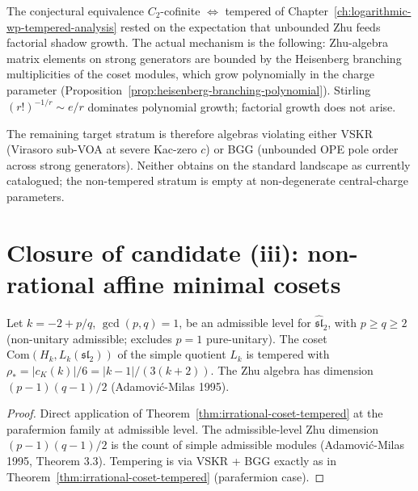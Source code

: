 \begin{remark}
\label{rem:heal-mode-refined-criterion}
The conjectural equivalence $C_2$-cofinite $\Leftrightarrow$ tempered
of Chapter~\ref{ch:logarithmic-wp-tempered-analysis} rested on the
expectation that unbounded Zhu feeds factorial shadow growth. The
actual mechanism is the following: Zhu-algebra matrix elements on
strong generators are bounded by the Heisenberg branching
multiplicities of the coset modules, which grow polynomially in the
charge parameter (Proposition~\ref{prop:heisenberg-branching-polynomial}).
Stirling $(r!)^{-1/r} \sim e/r$ dominates polynomial growth; factorial
growth does not arise.

The remaining target stratum is therefore algebras violating either
VSKR (Virasoro sub-VOA at severe Kac-zero $c$) or BGG (unbounded OPE
pole order across strong generators). Neither obtains on the standard
landscape as currently catalogued; the non-tempered stratum is empty
at non-degenerate central-charge parameters.
\end{remark}

\section{Closure of candidate (iii): non-rational affine minimal
cosets}
\label{sec:non-rational-affine-minimal}

\begin{corollary}
\label{cor:non-rational-affine-minimal-tempered}
\ClaimStatusProvedHere
Let $k = -2 + p/q$, $\gcd(p, q) = 1$, be an admissible level for
$\widehat{\mathfrak{sl}}_2$, with $p \ge q \ge 2$ (non-unitary
admissible; excludes $p = 1$ pure-unitary). The coset
$\mathrm{Com}(H_k, L_k(\mathfrak{sl}_2))$ of the simple quotient
$L_k$ is tempered with
$\rho_* = \lvert c_K(k) \rvert / 6 = \lvert k - 1 \rvert /
(3 (k + 2))$. The Zhu algebra has dimension $(p - 1)(q - 1) / 2$
(Adamović-Milas 1995).
\end{corollary}

\begin{proof}
Direct application of
Theorem~\ref{thm:irrational-coset-tempered} at the parafermion
family at admissible level. The admissible-level Zhu dimension
$(p - 1)(q - 1) / 2$ is the count of simple admissible modules
(Adamović-Milas 1995, Theorem 3.3). Tempering is via VSKR + BGG
exactly as in
Theorem~\ref{thm:irrational-coset-tempered} (parafermion case).
\end{proof}

